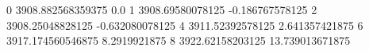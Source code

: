 0 3908.882568359375 0.0
1 3908.69580078125 -0.186767578125
2 3908.25048828125 -0.632080078125
4 3911.52392578125 2.641357421875
6 3917.174560546875 8.2919921875
8 3922.62158203125 13.739013671875
